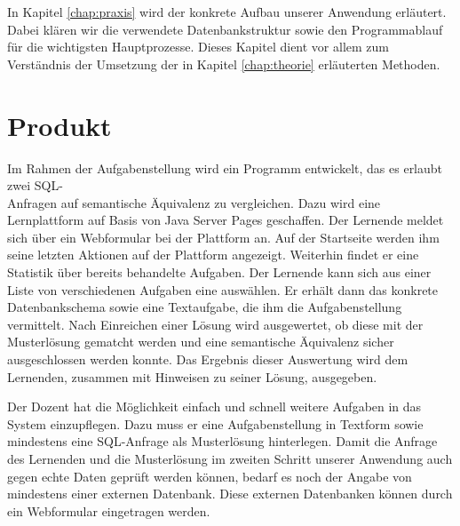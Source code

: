 In Kapitel \ref{chap:praxis} wird der konkrete Aufbau unserer Anwendung erläutert. Dabei klären wir die verwendete Datenbankstruktur sowie den Programmablauf für die wichtigsten Hauptprozesse. Dieses Kapitel dient vor allem zum Verständnis der Umsetzung der in Kapitel \ref{chap:theorie} erläuterten Methoden.

\section{Produkt}

Im Rahmen der Aufgabenstellung wird ein Programm entwickelt, das es erlaubt zwei SQL-\\Anfragen auf semantische Äquivalenz zu vergleichen. Dazu wird eine Lernplattform auf Basis von Java Server Pages geschaffen. Der Lernende meldet sich über ein Webformular bei der Plattform an. Auf der Startseite werden ihm seine letzten Aktionen auf der Plattform angezeigt. Weiterhin findet er eine Statistik über bereits behandelte Aufgaben. Der Lernende kann sich aus einer Liste von verschiedenen Aufgaben eine auswählen. Er erhält dann das konkrete Datenbankschema sowie eine Textaufgabe, die ihm die Aufgabenstellung vermittelt. Nach Einreichen einer Lösung wird ausgewertet, ob diese mit der Musterlösung gematcht werden und eine semantische Äquivalenz sicher ausgeschlossen werden konnte. Das Ergebnis dieser Auswertung wird dem Lernenden, zusammen mit Hinweisen zu seiner Lösung, ausgegeben.

Der Dozent hat die Möglichkeit einfach und schnell weitere Aufgaben in das System einzupflegen. Dazu muss er eine Aufgabenstellung in Textform sowie mindestens eine SQL-Anfrage als Musterlösung hinterlegen. Damit die Anfrage des Lernenden und die Musterlösung im zweiten Schritt unserer Anwendung auch gegen echte Daten geprüft werden können, bedarf es noch der Angabe von mindestens einer externen Datenbank. Diese externen Datenbanken können durch ein Webformular eingetragen werden.

